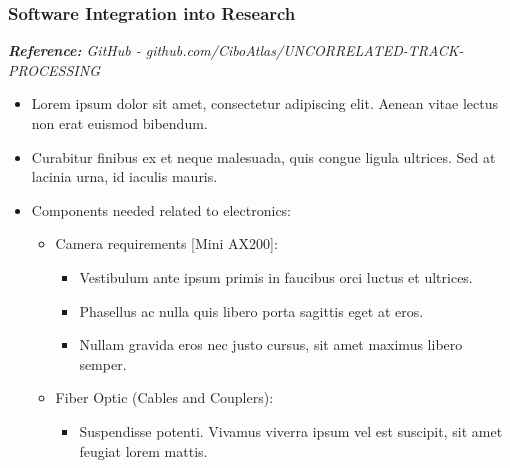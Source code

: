 \documentclass[11pt,letterpaper]{article}
\begin{document}
\subsubsection{Software Integration into Research}
\textit{\footnotesize{\textbf{Reference:} GitHub - github.com/CiboAtlas/UNCORRELATED-TRACK-PROCESSING}} \\ 
\begin{itemize} %
	\item Lorem ipsum dolor sit amet, consectetur adipiscing elit. Aenean vitae lectus non erat euismod bibendum.
	\item Curabitur finibus ex et neque malesuada, quis congue ligula ultrices. Sed at lacinia urna, id iaculis mauris.
	\item Components needed related to electronics:
	\begin{itemize}[label=$-$] %
		\item Camera requirements [Mini AX200]: 
			\begin{itemize} %
			\item Vestibulum ante ipsum primis in faucibus orci luctus et ultrices.
			\item Phasellus ac nulla quis libero porta sagittis eget at eros.
			\item Nullam gravida eros nec justo cursus, sit amet maximus libero semper.
			\end{itemize}
			
		\item Fiber Optic (Cables and Couplers): 
			\begin{itemize} %
			\item Suspendisse potenti. Vivamus viverra ipsum vel est suscipit, sit amet feugiat lorem mattis.
			\end{itemize}
	\end{itemize}
\end{itemize}
\end{document}
